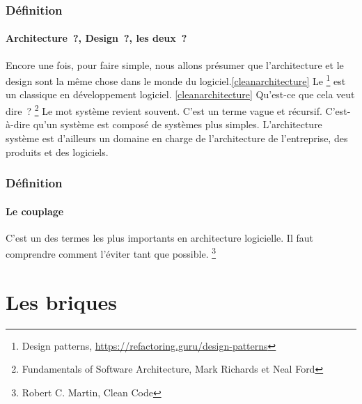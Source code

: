 \documentclass{beamer}
\begin{document}
    \begin{frame}
        \transdissolve
        \frametitle{Définition}
        \framesubtitle{Architecture~?, Design~?, les deux~?}
        Encore une fois, pour faire simple, nous allons présumer que l'architecture et le design sont la même chose dans le monde du logiciel.\cref{cleanarchitecture}
        Le \footnote{Design patterns, \url{https://refactoring.guru/design-patterns}} est un classique en développement logiciel.
        \bigbreak
        \cref{cleanarchitecture} Qu'est-ce que cela veut dire~?
        \bigbreak
        \footnote{\label{fundsofsoftarch}Fundamentals of Software Architecture, Mark Richards et Neal Ford}
        \bigbreak
        Le mot système revient souvent.
        C'est un terme vague et récursif.
        C'est-à-dire qu'un système est composé de systèmes plus simples.
        L'architecture système est d'ailleurs un domaine en charge de l'architecture de l'entreprise, des produits et des logiciels.
    \end{frame}

    \begin{frame}
        \transdissolve
        \frametitle{Définition}
        \framesubtitle{Le couplage}
        C'est un des termes les plus importants en architecture logicielle.
        Il faut comprendre comment l'éviter tant que possible.
        \bigbreak
        \footnote{\label{cleancode}Robert C. Martin, Clean Code}
    \end{frame}


    \section{Les briques}\label{sec:les-briques}
\end{document}
